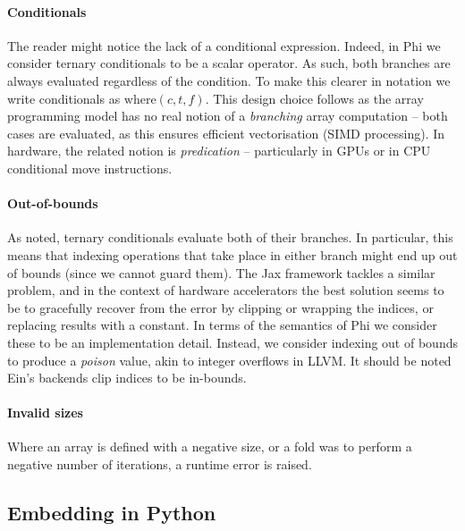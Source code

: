 \paragraph{Conditionals} The reader might notice the lack of a conditional expression. Indeed, in Phi we consider ternary conditionals to be a scalar operator. As such, both branches are always evaluated regardless of the condition. To make this clearer in notation we write conditionals as $\mathrm{where}(c, t, f)$. This design choice follows as the array programming model has no real notion of a \textit{branching} array computation -- both cases are evaluated, as this ensures efficient vectorisation (SIMD processing). In hardware, the related notion is \textit{predication} -- particularly in GPUs or in CPU conditional move instructions.

\paragraph{Out-of-bounds} As noted, ternary conditionals evaluate both of their branches. In particular, this means that indexing operations that take place in either branch might end up out of bounds (since we cannot guard them). 
The Jax framework tackles a similar problem, and in the context of hardware accelerators the best solution seems to be to gracefully recover from the error by clipping or wrapping the indices, or replacing results with a constant. 
In terms of the semantics of Phi we consider these to be an implementation detail. Instead, we consider indexing out of bounds to produce a \textit{poison} value, akin to integer overflows in LLVM. It should be noted Ein's backends clip indices to be in-bounds.

\paragraph{Invalid sizes} Where an array is defined with a negative size, or a fold was to perform a negative number of iterations, a runtime error is raised. 

\subsection{Embedding in Python}

